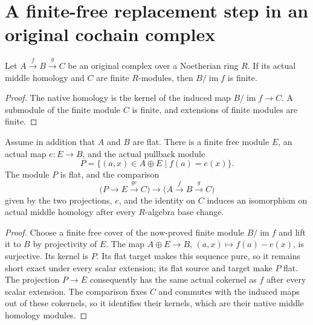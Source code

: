 \section{A finite-free replacement step in an original cochain complex}

\begin{lemma}
\label{lem:kn-derived-finite-cokernel}
\leanok
Let $A\xrightarrow f B\xrightarrow g C$ be an original complex over a
Noetherian ring $R$.  If its actual middle homology and $C$ are finite
$R$-modules, then $B/\operatorname{im}f$ is finite.
\end{lemma}
\begin{proof}
The native homology is the kernel of the induced map
$B/\operatorname{im}f\longrightarrow C$.  A submodule of the finite
module $C$ is finite, and extensions of finite modules are finite.
\end{proof}

\begin{lemma}
\label{lem:kn-derived-free-replacement-step}
\leanok
Assume in addition that $A$ and $B$ are flat.  There is a finite free
module $E$, an actual map $e:E\to B$, and the actual pullback module
\[
 P=\{(a,x)\in A\oplus E\mid f(a)=e(x)\}.
\]
The module $P$ is flat, and the comparison
\[
 \bigl(P\longrightarrow E\xrightarrow{ge}C\bigr)
   \longrightarrow
 \bigl(A\xrightarrow f B\xrightarrow g C\bigr)
\]
given by the two projections, $e$, and the identity on $C$ induces an
isomorphism on actual middle homology after every $R$-algebra base
change.
\end{lemma}
\begin{proof}
Choose a finite free cover of the now-proved finite module
$B/\operatorname{im}f$ and lift it to $B$ by projectivity of $E$.
The map $A\oplus E\to B$, $(a,x)\mapsto f(a)-e(x)$, is surjective.
Its kernel is $P$.  Its flat target makes this sequence pure, so it
remains short exact under every scalar extension; its flat source
and target make $P$ flat.  The projection $P\to E$ consequently has
the same actual cokernel as $f$ after every scalar extension.  The
comparison fixes $C$ and commutes with the induced maps out of these
cokernels, so it identifies their kernels, which are their native
middle homology modules.
\end{proof}

